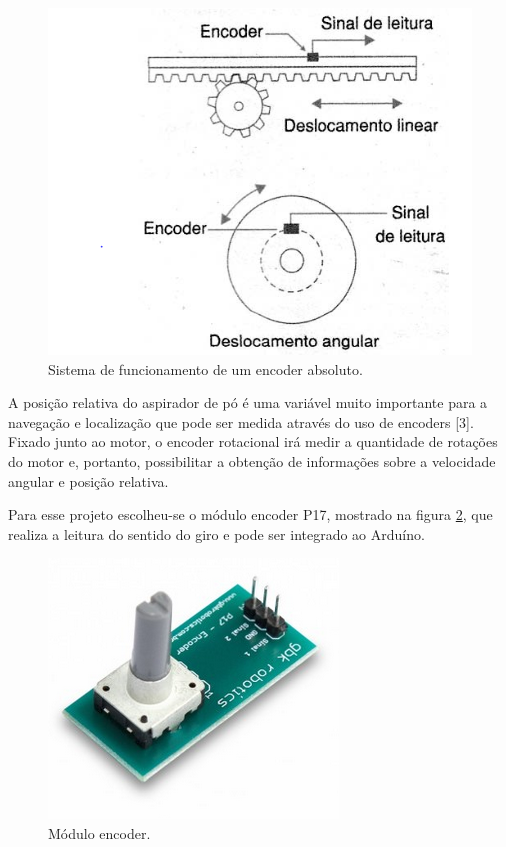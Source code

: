 \begin{enumerate}
					\begin{figure}[H]
						\centering
						\includegraphics[scale=0.6]{figuras/encoder.png}
						\caption{Sistema de funcionamento de um encoder absoluto.}
						\label{img:encoder}
					\end{figure}

					A posição relativa do aspirador de pó é uma variável muito importante para a navegação e localização que pode ser medida através do uso de encoders [3]. Fixado junto ao motor, o encoder rotacional irá medir a quantidade de rotações do motor e, portanto, possibilitar a obtenção de informações sobre a velocidade angular e posição relativa. 

					Para esse projeto escolheu-se o módulo encoder P17, mostrado na figura \ref{img:modulo_encoder}, que realiza a leitura do sentido do giro e pode ser integrado ao Arduíno.

					\begin{figure}[H]
						\centering
						\includegraphics[scale=0.6]{figuras/modulo_encoder.png}
						\caption{Módulo encoder.}
						\label{img:modulo_encoder}
					\end{figure}

			\end{enumerate}



